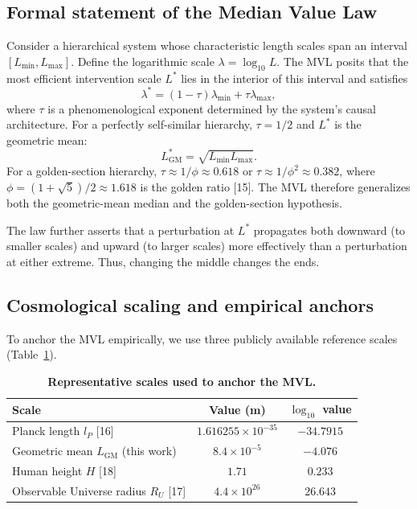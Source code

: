 \documentclass[11pt,a4paper]{article}
\begin{document}
\subsection{Formal statement of the Median Value Law}

Consider a hierarchical system whose characteristic length scales span an interval $[L_{\min}, L_{\max}]$. Define the logarithmic scale $\lambda = \log_{10} L$. The MVL posits that the most efficient intervention scale $L^*$ lies in the interior of this interval and satisfies
\begin{equation}
\lambda^* = (1-\tau)\lambda_{\min} + \tau\lambda_{\max},
\label{eq:mvl}
\end{equation}
where $\tau$ is a phenomenological exponent determined by the system's causal architecture. For a perfectly self-similar hierarchy, $\tau = 1/2$ and $L^*$ is the geometric mean:
\begin{equation}
L^*_{\mathrm{GM}} = \sqrt{L_{\min}L_{\max}}.
\label{eq:gm}
\end{equation}
For a golden-section hierarchy, $\tau \approx 1/\phi \approx 0.618$ or $\tau \approx 1/\phi^2 \approx 0.382$, where $\phi = (1+\sqrt{5})/2 \approx 1.618$ is the golden ratio [15]. The MVL therefore generalizes both the geometric-mean median and the golden-section hypothesis.

The law further asserts that a perturbation at $L^*$ propagates both downward (to smaller scales) and upward (to larger scales) more effectively than a perturbation at either extreme. Thus, changing the middle changes the ends.

\subsection{Cosmological scaling and empirical anchors}

To anchor the MVL empirically, we use three publicly available reference scales (Table~\ref{tab:scales}).

\begin{table}[htbp]
\centering
\caption{\textbf{Representative scales used to anchor the MVL.}}
\label{tab:scales}
\begin{tabular}{@{}lcc@{}}
\toprule
Scale & Value (m) & $\log_{10}$ value \\
\midrule
Planck length $l_P$ [16] & $1.616255\times 10^{-35}$ & $-34.7915$ \\
Geometric mean $L_{\mathrm{GM}}$ (this work) & $8.4\times 10^{-5}$ & $-4.076$ \\
Human height $H$ [18] & $1.71$ & $0.233$ \\
Observable Universe radius $R_U$ [17] & $4.4\times 10^{26}$ & $26.643$ \\
\bottomrule
\end{tabular}
\end{table}
\end{document}
